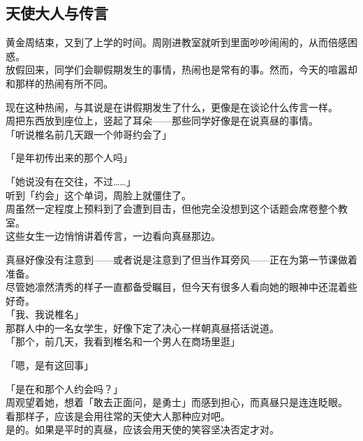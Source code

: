 \subsection{天使大人与传言}

黄金周结束，又到了上学的时间。周刚进教室就听到里面吵吵闹闹的，从而倍感困惑。\\

放假回来，同学们会聊假期发生的事情，热闹也是常有的事。然而，今天的喧嚣却和那样的热闹有所不同。

现在这种热闹，与其说是在讲假期发生了什么，更像是在谈论什么传言一样。\\

周把东西放到座位上，竖起了耳朵——那些同学好像是在说真昼的事情。\\

「听说椎名前几天跟一个帅哥约会了」

「是年初传出来的那个人吗」

「她说没有在交往，不过……」\\

听到「约会」这个单词，周脸上就僵住了。\\

周虽然一定程度上预料到了会遭到目击，但他完全没想到这个话题会席卷整个教室。\\

这些女生一边悄悄讲着传言，一边看向真昼那边。

真昼好像没有注意到——或者说是注意到了但当作耳旁风——正在为第一节课做着准备。\\

尽管她凛然清秀的样子一直都备受瞩目，但今天有很多人看向她的眼神中还混着些好奇。\\

「我、我说椎名」\\

那群人中的一名女学生，好像下定了决心一样朝真昼搭话说道。\\

「那个，前几天，我看到椎名和一个男人在商场里逛」

「嗯，是有这回事」

「是在和那个人约会吗？」\\

周观望着她，想着「敢去正面问，是勇士」而感到担心，而真昼只是连连眨眼。\\

看那样子，应该是会用往常的天使大人那种应对吧。\\

是的。如果是平时的真昼，应该会用天使的笑容坚决否定才对。\\

